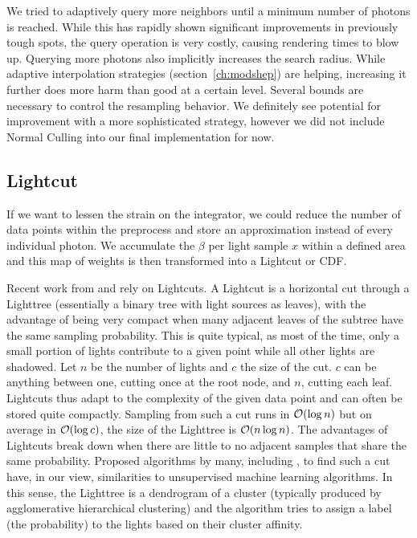 We tried to adaptively query more neighbors until a minimum number of photons is reached. While this has rapidly shown significant improvements in previously tough spots, the query operation is very costly, causing rendering times to blow up. Querying more photons also implicitly increases the search radius. While adaptive interpolation strategies (section~\ref{ch:modshep}) are helping, increasing it further does more harm than good at a certain level. Several bounds are necessary to control the resampling behavior. We definitely see potential for improvement with a more sophisticated strategy, however we did not include Normal Culling into our final implementation for now.

\subsection{Lightcut}
\label{sec:lightcutd}
If we want to lessen the strain on the integrator, we could reduce the number of data points within the preprocess and store an approximation instead of every individual photon. We accumulate the $\beta$ per light sample $x$ within a defined area and this map of weights is then transformed into a Lightcut or CDF.

Recent work from \textcite{Estevez} and \textcite{Vevoda} rely on Lightcuts. A Lightcut is a horizontal cut through a Lighttree (essentially a binary tree with light sources as leaves), with the advantage of being very compact when many adjacent leaves of the subtree have the same sampling probability. This is quite typical, as most of the time, only a small portion of lights contribute to a given point while all other lights are shadowed. Let $n$ be the number of lights and $c$ the size of the cut. $c$ can be anything between one, cutting once at the root node, and $n$, cutting each leaf. Lightcuts thus adapt to the complexity of the given data point and can often be stored quite compactly. Sampling from such a cut runs in $\mathcal{O}(\log{n})$ but on average in $\mathcal{O}(\log{c})$, the size of the Lighttree is $\mathcal{O}(n\log{n})$. The advantages of Lightcuts break down when there are little to no adjacent samples that share the same probability. Proposed algorithms by many, including \textcite{Estevez}, to find such a cut have, in our view, similarities to unsupervised machine learning algorithms. In this sense, the Lighttree is a dendrogram of a cluster (typically produced by agglomerative hierarchical clustering) and the algorithm tries to assign a label (the probability) to the lights based on their cluster affinity. 

